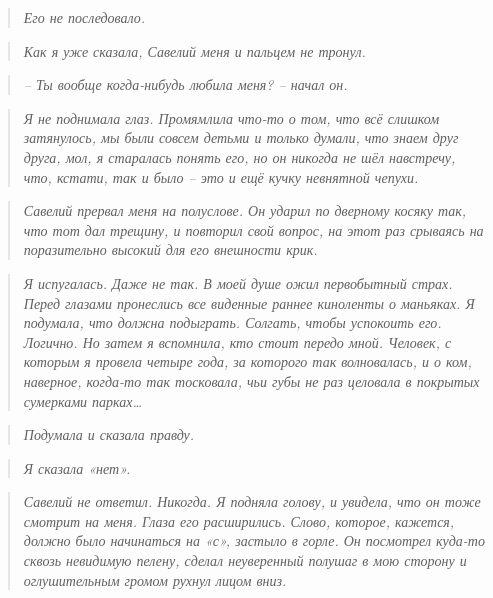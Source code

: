\documentclass[
  a5paperpaper,
  DIV=11,
  numbers=noendperiod]{scrreprt}
\begin{document}
\begin{quote}
\emph{Его не последовало.}
\end{quote}

\begin{quote}
\emph{Как я уже сказала, Савелий меня и пальцем не тронул.}
\end{quote}

\begin{quote}
\emph{-- Ты вообще когда-нибудь любила меня? -- начал он.}
\end{quote}

\begin{quote}
\emph{Я не поднимала глаз. Промямлила что-то о том, что всё слишком
затянулось, мы были совсем детьми и только думали, что знаем друг друга,
мол, я старалась понять его, но он никогда не шёл навстречу, что,
кстати, так и было -- это и ещё кучку невнятной чепухи.}
\end{quote}

\begin{quote}
\emph{Савелий прервал меня на полуслове. Он ударил по дверному косяку
так, что тот дал трещину, и повторил свой вопрос, на этот раз срываясь
на поразительно высокий для его внешности крик.}
\end{quote}

\begin{quote}
\emph{Я испугалась. Даже не так. В моей душе ожил первобытный страх.
Перед глазами пронеслись все виденные раннее киноленты о маньяках. Я
подумала, что должна подыграть. Солгать, чтобы успокоить его. Логично.
Но затем я вспомнила, кто стоит передо мной. Человек, с которым я
провела четыре года, за которого так волновалась, и о ком, наверное,
когда-то так тосковала, чьи губы не раз целовала в покрытых сумерками
парках\ldots{} }
\end{quote}

\begin{quote}
\emph{Подумала и сказала правду.}
\end{quote}

\begin{quote}
\emph{Я сказала «нет».}
\end{quote}

\begin{quote}
\emph{Савелий не ответил. Никогда. Я подняла голову, и увидела, что он
тоже смотрит на меня. Глаза его расширились. Слово, которое, кажется,
должно было начинаться на «с», застыло в горле. Он посмотрел куда-то
сквозь невидимую пелену, сделал неуверенный полушаг в мою сторону и
оглушительным громом рухнул лицом вниз.}
\end{quote}
\end{document}
